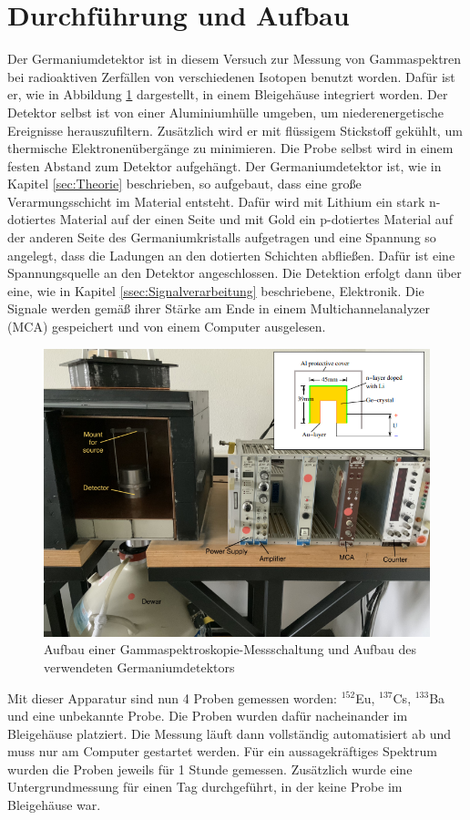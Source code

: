\section{Durchführung und Aufbau}
\label{sec:Durchführung}
Der Germaniumdetektor ist in diesem Versuch zur Messung von Gammaspektren bei radioaktiven Zerfällen von verschiedenen Isotopen benutzt worden. 
Dafür ist er, wie in Abbildung \ref{fig:germanium} dargestellt, in einem Bleigehäuse integriert worden. Der Detektor selbst ist von einer Aluminiumhülle umgeben, um niederenergetische Ereignisse herauszufiltern.
Zusätzlich wird er mit flüssigem Stickstoff gekühlt, um thermische Elektronenübergänge zu minimieren. Die Probe selbst wird in einem festen Abstand zum Detektor aufgehängt.
Der Germaniumdetektor ist, wie in Kapitel \ref{sec:Theorie} beschrieben, so aufgebaut, dass eine große Verarmungsschicht im Material entsteht. Dafür wird mit Lithium 
ein stark n-dotiertes Material auf der einen Seite und mit Gold ein p-dotiertes Material auf der anderen Seite des Germaniumkristalls aufgetragen und eine Spannung so angelegt, dass die Ladungen an den dotierten Schichten 
abfließen. Dafür ist eine Spannungsquelle an den Detektor angeschlossen. Die Detektion erfolgt dann über eine, wie in Kapitel \ref{ssec:Signalverarbeitung} beschriebene, Elektronik. Die Signale werden gemäß ihrer Stärke 
am Ende in einem Multichannelanalyzer (MCA) gespeichert und von einem Computer ausgelesen. 
\begin{figure}[H]
    \centering
    \includegraphics[scale=0.8]{ilustration/Aufbau.png}
    \caption{Aufbau einer Gammaspektroskopie-Messschaltung und Aufbau des verwendeten Germaniumdetektors \cite{V18}}
    \label{fig:germanium}
\end{figure}
\noindent Mit dieser Apparatur sind nun 4 Proben gemessen worden: $^{152}$Eu, $^{137}$Cs, $^{133}$Ba und eine unbekannte Probe.
Die Proben wurden dafür nacheinander im Bleigehäuse platziert. Die Messung läuft dann vollständig automatisiert ab und muss nur am Computer gestartet werden. 
Für ein aussagekräftiges Spektrum wurden die Proben jeweils für 1 Stunde gemessen.
Zusätzlich wurde eine Untergrundmessung für einen Tag durchgeführt, in der keine Probe im Bleigehäuse war.
